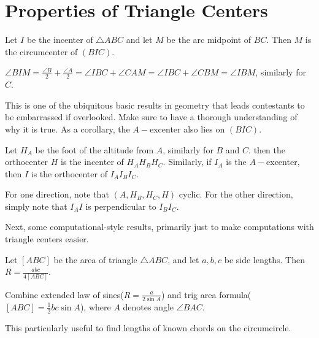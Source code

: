 \documentclass{article}
\begin{document}
\section{Properties of Triangle Centers}
\begin{theo}[Fact 5]
Let $I$ be the incenter of $\triangle ABC$ and let $M$ be the arc midpoint of $BC$. Then $M$ is the circumcenter of $(BIC)$.
\end{theo}
\begin{pro}
$\angle BIM = \frac{\angle B}2 + \frac{\angle A}2 = \angle IBC + \angle CAM = \angle IBC + \angle CBM = \angle IBM$, similarly for $C$.
\end{pro}
This is one of the ubiquitous basic results in geometry that leads contestants to be embarrassed if overlooked. Make sure to have a thorough understanding of why it is true. As a corollary, the $A-$excenter also lies on $(BIC)$.
\begin{exam}
Let $H_A$ be the foot of the altitude from $A$, similarly for $B$ and $C$. then the orthocenter $H$ is the incenter of $H_AH_BH_C$. Similarly, if $I_A$ is the $A-$excenter, then $I$ is the orthocenter of $I_AI_BI_C$.
\end{exam}
\begin{pro}
For one direction, note that $(A,H_B,H_C,H)$ cyclic. For the other direction, simply note that $I_AI$ is perpendicular to $I_BI_C$. 
\end{pro}
Next, some computational-style results, primarily just to make computations with triangle centers easier.
\begin{theo}
Let $[ABC]$ be the area of triangle $\triangle ABC$, and let $a,b,c$ be side lengths. Then $R = \frac{abc}{4[ABC]}$.
\end{theo}
\begin{pro}
Combine extended law of sines($R = \frac{a}{2\sin{A}}$) and trig area formula($[ABC] = \frac12 bc \sin{A}$), where $A$ denotes angle $\angle BAC$.
\end{pro}
This particularly useful to find lengths of known chords on the circumcircle.
\end{document}
